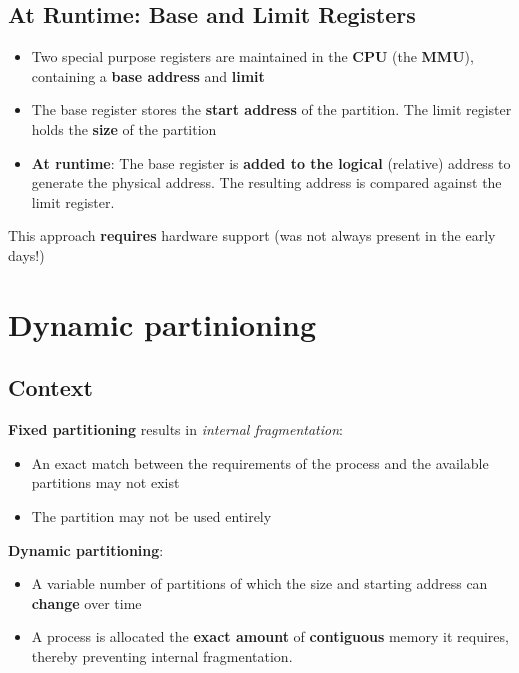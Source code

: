 \documentclass{article}
\begin{document}
\subsection{At Runtime: Base and Limit Registers}
\begin{flushleft}
\begin{itemize}
	\item Two special purpose registers are maintained in the \textbf{CPU} (the \textbf{MMU}), containing a \textbf{base address} and \textbf{limit}
	\item The base register stores the \textbf{start address} of the partition. The limit register holds the \textbf{size} of the partition 
	\item \textbf{At runtime}: The base register is \textbf{added to the logical} (relative) address to generate the physical address. The resulting address is compared against the limit register.
\end{itemize}
This approach \textbf{requires} hardware support (was not always present in the early days!)
\end{flushleft}

\section{Dynamic partinioning}
\subsection{Context}
\begin{flushleft}
\textbf{Fixed partitioning} results in \textit{internal fragmentation}:
\begin{itemize}
	\item An exact match between the requirements of the process and the available partitions may not exist
	\item The partition may not be used entirely 
\end{itemize}
\textbf{Dynamic partitioning}:
\begin{itemize}
	\item A variable number of partitions of which the size and starting address can \textbf{change} over time
	\item A process is allocated the \textbf{exact amount} of \textbf{contiguous} memory it requires, thereby preventing internal fragmentation.
\end{itemize}
\end{flushleft}
\end{document}
